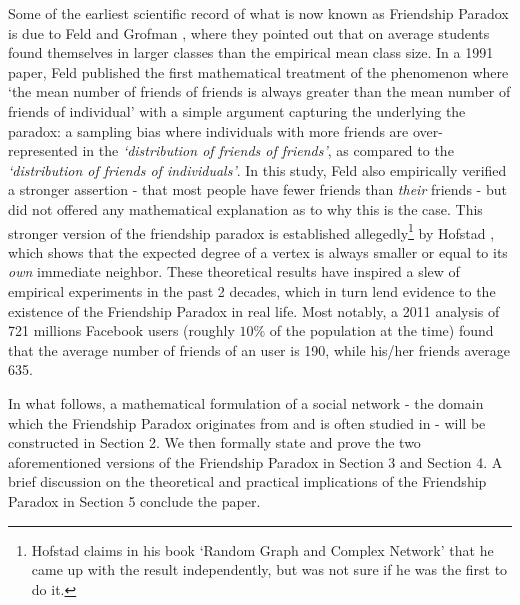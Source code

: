 \documentclass[12pt,reqno, a4]{amsart}
\begin{document}
Some of the earliest scientific record of what is now known as Friendship Paradox is due to Feld and Grofman \autocite{feld_variation_1977}, where they pointed out that on average students found themselves in larger classes than the empirical mean class size. In a 1991 paper, Feld \cite{feld_why_1991} published the first mathematical treatment of the phenomenon where `the
 mean number of friends of friends is always greater than the mean number of friends of individual' with a simple argument capturing the  underlying the paradox: a sampling bias where individuals with more friends are over-represented in the \textit{`distribution of friends of friends'}, as compared to the \textit{`distribution of friends of individuals'}. In this study, Feld also empirically verified a stronger assertion - that most people have fewer friends than \textit{their} friends - but did not offered any mathematical explanation as to why this is the case. This stronger version of the friendship paradox is established allegedly\footnote{Hofstad claims in his book `Random Graph and Complex Network'\cite{hofstad_random_2016} that he came up with the result independently, but was not sure if he was the first to do it.} by Hofstad \cite{hofstad_random_2016}, which shows that the expected degree of a vertex is always smaller or equal to its \textit{own} immediate neighbor. These theoretical results have inspired a slew of empirical experiments in the past 2 decades, which in turn lend evidence to the existence of the Friendship Paradox in real life. Most notably, a 2011 analysis \cite{ugander_anatomy_2011} of 721 millions Facebook users (roughly $10\%$ of the population at the time) found that the average number of friends of an user is 190, while his/her friends average 635.

 In what follows, a mathematical formulation of a social network - the domain which the Friendship Paradox originates from and is often studied in - will be constructed in Section 2. We then formally state and prove the two aforementioned versions of the Friendship Paradox in Section 3 and Section 4. A brief discussion on the theoretical and practical implications of the Friendship Paradox in Section 5 conclude the paper.
\end{document}
